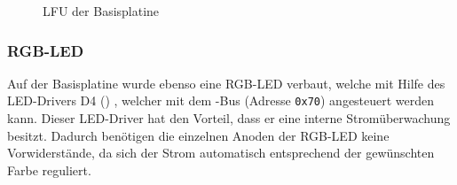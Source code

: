 \begin{figure}[H]
    \centering
    \qquad
    \qquad
    \caption[LFU der Basisplatine]{LFU der \gls{Basisplatine}}
    \label{fig:basisplatine-lfu}
\end{figure}

\subsubsection{RGB-LED}
Auf der \gls{Basisplatine} wurde ebenso eine RGB-LED \cite{basis:rgbled} verbaut, welche mit Hilfe des LED-Drivers D4 () \cite{basis:rgbdriver}, welcher mit dem \IIC{}-Bus (Adresse \texttt{0x70}) angesteuert werden kann. Dieser LED-Driver hat den Vorteil, dass er eine interne Stromüberwachung besitzt. Dadurch benötigen die einzelnen Anoden der RGB-LED keine Vorwiderstände, da sich der Strom automatisch entsprechend der gewünschten Farbe reguliert.

